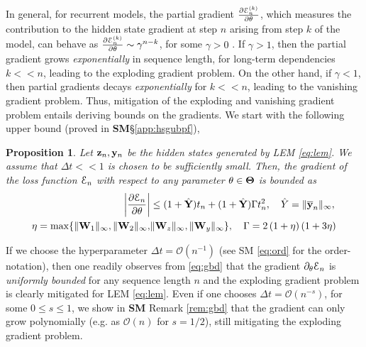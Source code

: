 \documentclass{article} \usepackage{iclr2022_conference,times}
\newcommand{\by}{{\bf y}}
\newcommand{\bz}{{\bf z}}
\newcommand{\bW}{{\bf W}}
\newcommand{\bY}{{\bf Y}}
\newcommand{\ord}{{\mathcal O}}
\newcommand{\Dt}{{\Delta t}}
\newcommand{\E}{\EuScript{E}}
\newtheorem{proposition}[theorem]{Proposition}
\begin{document}
In general, for recurrent models, the partial gradient $\frac{\partial \E^{(k)}_n}{\partial \theta}$, which measures the contribution to the hidden state gradient at step $n$ arising from step $k$ of the model, can behave as $\frac{\partial \E^{(k)}_n}{\partial \theta} \sim \gamma^{n-k}$, for some $\gamma > 0$ \cite{vanish_grad}. If $\gamma > 1$, then the partial gradient grows \emph{exponentially} in sequence length, for long-term dependencies $k << n$, leading to the exploding gradient problem. On the other hand, if $\gamma < 1$, then partial gradients decays \emph{exponentially} for $k << n$, leading to the vanishing gradient problem. Thus, mitigation of the exploding and vanishing gradient problem entails deriving bounds on the gradients. We start with the following upper bound (proved in {\bf SM}\S\ref{app:hsgubpf}), 
\begin{proposition}
\label{prop:2}
Let $\bz_n,\by_n$ be the hidden states generated by LEM \eqref{eq:lem}. We assume that $\Dt << 1$ is chosen to be sufficiently small. Then, the gradient of the loss function $\E_n$ with respect to any parameter $\theta \in {\bf \Theta}$ is bounded as 
\begin{equation}
\label{eq:gbd}
\begin{aligned}
  \left| \frac{\partial \E_n}{\partial \theta} \right|  &\leq (1+\hat{\bY}) t_n + (1+\hat{\bY}) \Gamma t_n^2, \quad \hat{Y} = \|\overline{\by}_n\|_{\infty}, \\
  \eta = \max \{ \|\bW_1\|_{\infty},\|\bW_2\|_{\infty},&\|\bW_z\|_{\infty},\|\bW_y\|_{\infty} \}, \quad \Gamma=  2\left(1 + \eta\right)(1 + 3 \eta)
  \end{aligned}
\end{equation}
\end{proposition}
If we choose the hyperparameter $\Dt = \ord(n^{-1})$ (see SM \eqref{eq:ord} for the order-notation), then one readily observes from \eqref{eq:gbd} that the gradient $\partial_{\theta} \E_n$ is \emph{uniformly bounded} for any sequence length $n$ and the exploding gradient problem is clearly mitigated for LEM \eqref{eq:lem}. Even if one chooses $\Dt = \ord(n^{-s})$, for some $0 \leq s \leq 1$, we show in {\bf SM} Remark \ref{rem:gbd} that the gradient can only grow polynomially (e.g. as $\ord(n)$ for $s=1/2$), still mitigating the exploding gradient problem.
\end{document}
